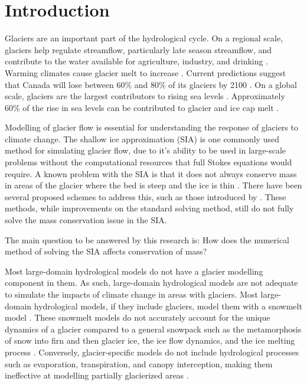 \documentclass{article}
\begin{document}
\newpage
\section{Introduction}
Glaciers are an important part of the hydrological cycle. On a regional scale, glaciers help regulate streamflow, particularly late season streamflow, and contribute to the water available for agriculture, industry, and drinking \citep{Naz2014, Kaser2010, Meier2007}. Warming climates cause glacier melt to increase \citep{Meier2007, Clarke2015, Kaser2010}. Current predictions suggest that Canada will lose between 60\% and 80\% of its glaciers by 2100 \citep{Clarke2015}. On a global scale,  glaciers are the largest contributors to rising sea levels \citep{Marzeion2012}. Approximately 60\% of the rise in sea levels can be contributed to glacier and ice cap melt \citep{Meier2007}.

Modelling of glacier flow is essential for understanding the response of glaciers to climate change. The shallow ice approximation (SIA) is one commonly used method for simulating glacier flow, due to it's ability to be used in large-scale problems without the computational resources that full Stokes equations would require. A known problem with the SIA is that it does not always conserve mass in areas of the glacier where the bed is steep and the ice is thin \citep{Jarosch2013, Hindmarsh1996}. There have been several proposed schemes to address this, such as those introduced by \citet{Jarosch2013, Clarke2015}. These methods, while improvements on the standard solving method, still do not fully solve the mass conservation issue in the SIA. 

The main question to be answered by this research is: How does the numerical method of solving the SIA affects conservation of mass? 

Most large-domain hydrological models do not have a glacier modelling component in them. As such, large-domain hydrological models are not adequate to simulate the impacts of climate change in areas with glaciers. Most large-domain hydrological models, if they include glaciers, model them with a snowmelt model \citep{Pradhananga2020, Naz2014}. These snowmelt models do not accurately account for the unique dynamics of a glacier compared to a general snowpack such as the metamorphosis of snow into firn and then glacier ice, the ice flow dynamics, and the ice melting process \citep{Pradhananga2020}. Conversely, glacier-specific models do not include hydrological processes such as evaporation, transpiration, and canopy interception, making them ineffective at modelling partially glacierized areas \citep{Clarke2015, Maussion2019, Rounce2020}. 
\end{document}

